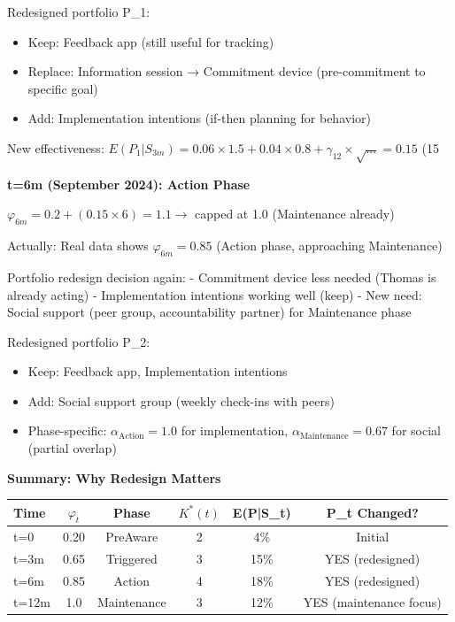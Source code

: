 Redesigned portfolio P_1:
\begin{itemize}[nosep]
\item Keep: Feedback app (still useful for tracking)
\item Replace: Information session → Commitment device (pre-commitment to specific goal)
\item Add: Implementation intentions (if-then planning for behavior)
\end{itemize}

New effectiveness: $E(P_1 | S_{3m}) = 0.06 \times 1.5 + 0.04 \times 0.8 + \gamma_{12} \times \sqrt{...} = 0.15$ (15%

\textbf{t=6m (September 2024): Action Phase}

$\varphi_{6m} = 0.2 + (0.15 \times 6) = 1.1 \to$ capped at 1.0 (Maintenance already)

Actually: Real data shows $\varphi_{6m} = 0.85$ (Action phase, approaching Maintenance)

Portfolio redesign decision again:
- Commitment device less needed (Thomas is already acting)
- Implementation intentions working well (keep)
- New need: Social support (peer group, accountability partner) for Maintenance phase

Redesigned portfolio P_2:
\begin{itemize}[nosep]
\item Keep: Feedback app, Implementation intentions
\item Add: Social support group (weekly check-ins with peers)
\item Phase-specific: $\alpha_{\text{Action}} = 1.0$ for implementation, $\alpha_{\text{Maintenance}} = 0.67$ for social (partial overlap)
\end{itemize}

\textbf{Summary: Why Redesign Matters}

\begin{center}
\begin{tabular}{lccccc}
\toprule
\textbf{Time} & $\varphi_t$ & \textbf{Phase} & $K^*(t)$ & \textbf{E(P|S_t)} & \textbf{P_t Changed?} \\
\midrule
t=0 & 0.20 & PreAware & 2 & 4\% & Initial \\
t=3m & 0.65 & Triggered & 3 & 15\% & YES (redesigned) \\
t=6m & 0.85 & Action & 4 & 18\% & YES (redesigned) \\
t=12m & 1.0 & Maintenance & 3 & 12\% & YES (maintenance focus) \\
\bottomrule
\end{tabular}
\end{center}

